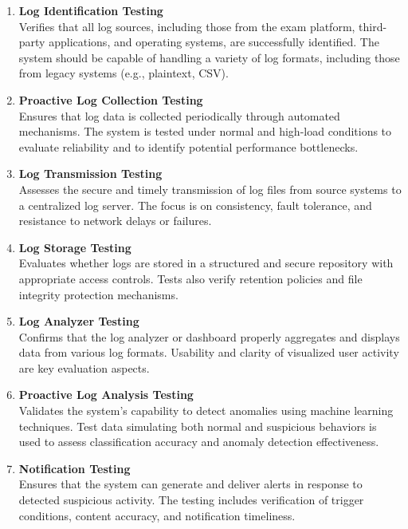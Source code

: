 \begin{enumerate}
    \item \textbf{Log Identification Testing} \\
    Verifies that all log sources, including those from the exam platform, third-party applications, and operating systems, are successfully identified. The system should be capable of handling a variety of log formats, including those from legacy systems (e.g., plaintext, CSV).
    
    \item \textbf{Proactive Log Collection Testing} \\
    Ensures that log data is collected periodically through automated mechanisms. The system is tested under normal and high-load conditions to evaluate reliability and to identify potential performance bottlenecks.
    
    \item \textbf{Log Transmission Testing} \\
    Assesses the secure and timely transmission of log files from source systems to a centralized log server. The focus is on consistency, fault tolerance, and resistance to network delays or failures.
    
    \item \textbf{Log Storage Testing} \\
    Evaluates whether logs are stored in a structured and secure repository with appropriate access controls. Tests also verify retention policies and file integrity protection mechanisms.
    
    \item \textbf{Log Analyzer Testing} \\
    Confirms that the log analyzer or dashboard properly aggregates and displays data from various log formats. Usability and clarity of visualized user activity are key evaluation aspects.
    
    \item \textbf{Proactive Log Analysis Testing} \\
    Validates the system's capability to detect anomalies using machine learning techniques. Test data simulating both normal and suspicious behaviors is used to assess classification accuracy and anomaly detection effectiveness.
    
    \item \textbf{Notification Testing} \\
    Ensures that the system can generate and deliver alerts in response to detected suspicious activity. The testing includes verification of trigger conditions, content accuracy, and notification timeliness.
    

\end{enumerate}
